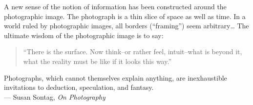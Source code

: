 \thispagestyle{empty}
{}

\vspace*{3cm}

\begin{center}
    A new sense of the notion of information has been constructed around the photographic image. The photograph is a thin slice of space as well as time. In a world ruled by photographic images, all borders (``framing'') seem arbitrary\ldots
    The ultimate wisdom of the photographic image is to say:
    \begin{quote}
      ``There is the surface. Now think--or rather feel, intuit--what is beyond it, what the reality must be like if it looks this way.''
      \end{quote}
    Photographs, which cannot themselves explain anything, are inexhaustible invitations to deduction, speculation, and fantasy. \\
    --- Susan Sontag, \emph{On Photography}
\end{center}

\medskip
%
